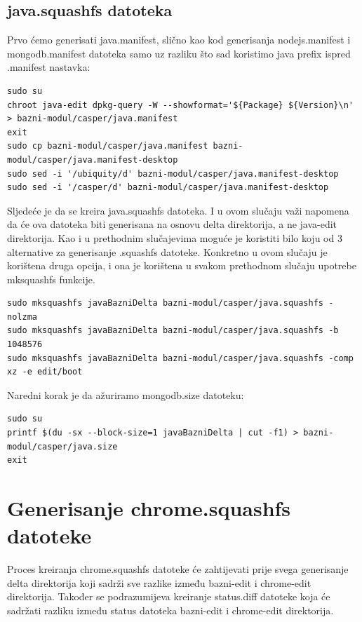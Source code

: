 \documentclass[12pt,vi]{mitthesis}
\begin{document}
\subsection*{java.squashfs datoteka}
\indent
Prvo ćemo generisati java.manifest, slično kao kod generisanja nodejs.manifest i mongodb.manifest datoteka samo uz razliku što sad koristimo java prefix ispred .manifest nastavka:
\begin{lstlisting}[style=BashInputStyle]
sudo su
chroot java-edit dpkg-query -W --showformat='${Package} ${Version}\n' > bazni-modul/casper/java.manifest
exit
sudo cp bazni-modul/casper/java.manifest bazni-modul/casper/java.manifest-desktop
sudo sed -i '/ubiquity/d' bazni-modul/casper/java.manifest-desktop
sudo sed -i '/casper/d' bazni-modul/casper/java.manifest-desktop
\end{lstlisting}
\indent
Sljedeće je da se kreira java.squashfs datoteka. I u ovom slučaju važi napomena da će ova datoteka biti generisana na osnovu delta direktorija, a ne java-edit direktorija. Kao i u prethodnim slučajevima moguće je koristiti bilo koju od 3 alternative za generisanje .squashfs datoteke. Konkretno u ovom slučaju je korištena druga opcija, i ona je korištena u svakom prethodnom slučaju upotrebe mksquashfs funkcije.
\begin{lstlisting}[style=BashInputStyle]
sudo mksquashfs javaBazniDelta bazni-modul/casper/java.squashfs -nolzma 
sudo mksquashfs javaBazniDelta bazni-modul/casper/java.squashfs -b 1048576
sudo mksquashfs javaBazniDelta bazni-modul/casper/java.squashfs -comp xz -e edit/boot
\end{lstlisting}

\noindent
Naredni korak je da ažuriramo mongodb.size datoteku:
\begin{lstlisting}[style=BashInputStyle]
sudo su
printf $(du -sx --block-size=1 javaBazniDelta | cut -f1) > bazni-modul/casper/java.size
exit
\end{lstlisting}

\section*{Generisanje chrome.squashfs datoteke}
\indent
Proces kreiranja chrome.squashfs datoteke će zahtijevati prije svega generisanje delta direktorija koji sadrži sve razlike između bazni-edit i chrome-edit direktorija. Također se podrazumijeva kreiranje status.diff datoteke koja će sadržati razliku između status datoteka bazni-edit i chrome-edit direktorija.\\
\end{document}
